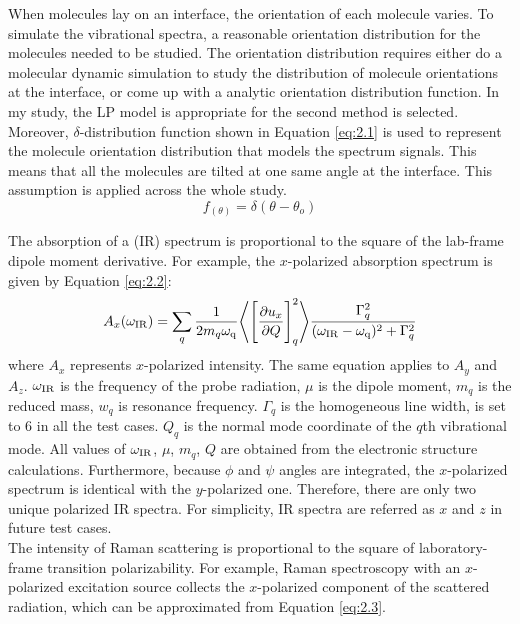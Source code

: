 When molecules lay on an interface, the orientation of each molecule varies. To simulate the vibrational spectra, a reasonable orientation distribution for the molecules needed to be studied. The orientation distribution requires either do a molecular dynamic simulation to study the distribution of molecule orientations at the interface, or come up with a analytic orientation distribution function. In my study, the LP model is appropriate for the second method is selected. Moreover, $\delta$-distribution function shown in Equation \ref{eq:2.1} is used to represent the molecule orientation distribution that models the spectrum signals. This means that all the molecules are tilted at one same angle at the interface. This assumption is applied across the whole study. \\

\begin{equation} \label{eq:2.1}
f_{(\theta)} = \delta(\theta - \theta_{o})
\end{equation} 

The absorption of a (IR) spectrum is proportional to the square of the lab-frame dipole moment derivative. For example, the $x$-polarized absorption spectrum is given by Equation \ref{eq:2.2}: \\

\begin{equation} \label{eq:2.2}
A_x(\omega_{\rm IR}) = \sum_{q} \frac{1}{2 m_{q} \omega_{\rm q}} \Bigg \langle \Bigg\lbrack \frac{\partial u_x}{\partial Q} \Bigg\rbrack_{q} ^2 \Bigg\rangle \frac{\Gamma_q^2}{(\omega_{\rm IR}-\omega_{\rm q})^2 + \Gamma_q^2}
\end{equation} 
where $A_x$ represents $x$-polarized intensity. The same equation applies to $A_y$ and $A_z$. $\omega_{\rm IR}$ is the frequency of the probe radiation, $\mu$ is the dipole moment, $m_q$ is the reduced mass, $w_q$ is resonance frequency. $\Gamma_q$ is the homogeneous line width, is set to $6$ in all the test cases. $Q_q$ is the normal mode coordinate of the $q$th vibrational mode. All values of $\omega_{\rm IR}$, $\mu$, $m_q$, $Q$ are obtained from the electronic structure calculations. Furthermore, because $\phi$ and $\psi$ angles are integrated, the $x$-polarized spectrum is identical with the $y$-polarized one. Therefore, there are only two unique polarized IR spectra. For simplicity, IR spectra are referred as $x$ and $z$ in future test cases. \\

The intensity of Raman scattering is proportional to the square of laboratory-frame transition polarizability. For example, Raman spectroscopy with an $x$-polarized excitation source collects the $x$-polarized component of the scattered radiation, which can be approximated from Equation \ref{eq:2.3}. \\

